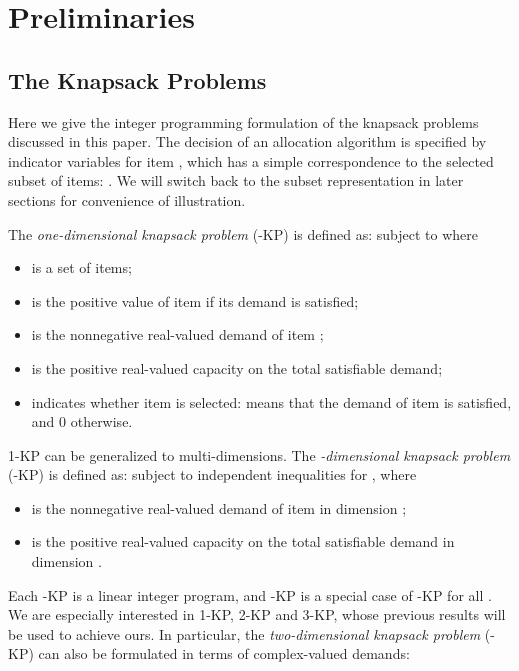 \documentclass{aamas2013}
\begin{document}
\section{Preliminaries}\label{sec:prelim}
\noindent
\subsection{The Knapsack Problems}
\noindent
Here we give the integer programming formulation of the knapsack problems discussed in this paper.  The decision of an allocation algorithm is specified by indicator variables  for item , which has a simple correspondence to the selected subset of items: .  We will switch back to the subset representation in later sections for convenience of illustration. 

The {\em one-dimensional knapsack problem} ({-KP}) is defined as: 
subject to 
where 
\begin{itemize}

\item  is a set of items;

\item  is the positive value of item  if its demand is satisfied;

\item  is the nonnegative real-valued demand of item ;

\item  is the positive real-valued capacity on the total satisfiable demand;

\item  indicates whether item  is selected:  means that the demand of item  is satisfied, and 0 otherwise.

\end{itemize}



1-KP can be generalized to multi-dimensions.  The {\em -dimensional knapsack problem} ({\sc -KP}) is defined as: 
subject to  independent inequalities
for , where 
\begin{itemize}

\item  is the nonnegative real-valued demand of item  in dimension ;

\item  is the positive real-valued capacity on the total satisfiable demand in dimension .

\end{itemize}
Each -KP is a linear integer program, and -KP is a special case of -KP for all .  We are especially interested in 1-KP, 2-KP and 3-KP, whose previous results will be used to achieve ours.  In particular, the {\em two-dimensional knapsack problem} ({-KP}) can also be formulated in terms of complex-valued demands:
\end{document}
